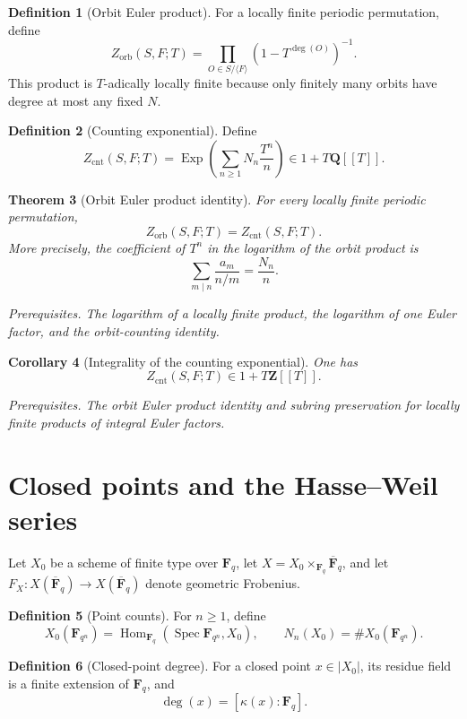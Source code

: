 \documentclass[10pt]{article}
\newtheorem{theorem}{Theorem}[section]
\newtheorem{corollary}[theorem]{Corollary}
\theoremstyle{definition}
\newtheorem{definition}[theorem]{Definition}
\newcommand{\Fq}{\mathbf F_q}
\newcommand{\Fbar}{\overline{\mathbf F}_q}
\newcommand{\Spec}{\operatorname{Spec}}
\newcommand{\deps}[1]{\par\smallskip\noindent\textit{Prerequisites.} #1}
\begin{document}
\begin{definition}[Orbit Euler product]
For a locally finite periodic permutation, define
\[
 Z_{\mathrm{orb}}(S,F;T)
 =\prod_{O\in S/\langle F\rangle}
  (1-T^{\deg(O)})^{-1}.
\]
This product is \(T\)-adically locally finite because only finitely many
orbits have degree at most any fixed \(N\).
\end{definition}

\begin{definition}[Counting exponential]
Define
\[
 Z_{\mathrm{cnt}}(S,F;T)
 =\operatorname{Exp}\left(\sum_{n\geq1}N_n\frac{T^n}{n}\right)
 \in1+T\mathbf Q[[T]].
\]
\end{definition}

\begin{theorem}[Orbit Euler product identity]
For every locally finite periodic permutation,
\[
 Z_{\mathrm{orb}}(S,F;T)=Z_{\mathrm{cnt}}(S,F;T).
\]
More precisely, the coefficient of \(T^n\) in the logarithm of the orbit
product is
\[
 \sum_{m\mid n}\frac{a_m}{n/m}=\frac{N_n}{n}.
\]
\deps{The logarithm of a locally finite product, the logarithm of one Euler
factor, and the orbit-counting identity.}
\end{theorem}

\begin{corollary}[Integrality of the counting exponential]
One has
\[
 Z_{\mathrm{cnt}}(S,F;T)\in1+T\mathbf Z[[T]].
\]
\deps{The orbit Euler product identity and subring preservation for locally
finite products of integral Euler factors.}
\end{corollary}

\section{Closed points and the Hasse--Weil series}

Let \(X_0\) be a scheme of finite type over \(\Fq\), let
\(X=X_0\times_{\Fq}\Fbar\), and let
\(F_X:X(\Fbar)\to X(\Fbar)\) denote geometric Frobenius.

\begin{definition}[Point counts]
For \(n\geq1\), define
\[
 X_0(\mathbf F_{q^n})
 =\operatorname{Hom}_{\Fq}(\Spec\mathbf F_{q^n},X_0),
 \qquad
 N_n(X_0)=\#X_0(\mathbf F_{q^n}).
\]
\end{definition}

\begin{definition}[Closed-point degree]
For a closed point \(x\in|X_0|\), its residue field is a finite extension
of \(\Fq\), and
\[
 \deg(x)=[\kappa(x):\Fq].
\]
\end{definition}
\end{document}
